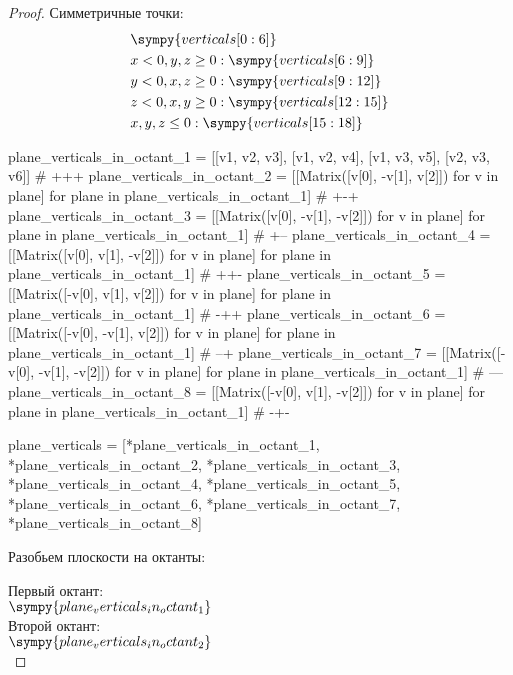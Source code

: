 \begin{proof}
    Симметричные точки:
    \[
        \begin{aligned}
             & \sympy{verticals[0:6]}                       \\
             & x < 0, y, z \geq 0: \sympy{verticals[6:9]}   \\
             & y < 0, x, z \geq 0: \sympy{verticals[9:12]}  \\
             & z < 0, x, y \geq 0: \sympy{verticals[12:15]} \\
             & x, y, z \leq 0: \sympy{verticals[15:18]}     \\
        \end{aligned}
    \]
    \begin{sympycode}
plane_verticals_in_octant_1 = [[v1, v2, v3], [v1, v2, v4], [v1, v3, v5], [v2, v3, v6]] # +++
plane_verticals_in_octant_2 = [[Matrix([v[0], -v[1], v[2]]) for v in plane] for plane in plane_verticals_in_octant_1] # +-+
plane_verticals_in_octant_3 = [[Matrix([v[0], -v[1], -v[2]]) for v in plane] for plane in plane_verticals_in_octant_1] # +--
plane_verticals_in_octant_4 = [[Matrix([v[0], v[1], -v[2]]) for v in plane] for plane in plane_verticals_in_octant_1] # ++-
plane_verticals_in_octant_5 = [[Matrix([-v[0], v[1], v[2]]) for v in plane] for plane in plane_verticals_in_octant_1] # -++
plane_verticals_in_octant_6 = [[Matrix([-v[0], -v[1], v[2]]) for v in plane] for plane in plane_verticals_in_octant_1] # --+
plane_verticals_in_octant_7 = [[Matrix([-v[0], -v[1], -v[2]]) for v in plane] for plane in plane_verticals_in_octant_1] # ---
plane_verticals_in_octant_8 = [[Matrix([-v[0], v[1], -v[2]]) for v in plane] for plane in plane_verticals_in_octant_1] # -+-

plane_verticals = [*plane_verticals_in_octant_1, *plane_verticals_in_octant_2, *plane_verticals_in_octant_3, *plane_verticals_in_octant_4, *plane_verticals_in_octant_5, *plane_verticals_in_octant_6, *plane_verticals_in_octant_7, *plane_verticals_in_octant_8]
\end{sympycode}

\vfill

    Разобьем плоскости на октанты:

    Первый октант: \\
    \(\sympy{plane_verticals_in_octant_1}\) \\

    Второй октант: \\
    \(\sympy{plane_verticals_in_octant_2}\) \\


\end{proof}

